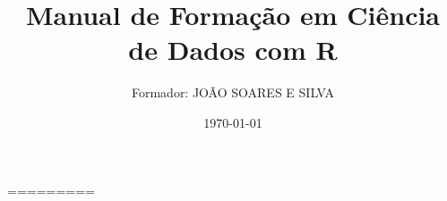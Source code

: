 \documentclass[12pt,a4paper]{article}
\title{\textbf{Manual de Formação em Ciência de Dados com R}}
\author{Formador: JOÃO SOARES E SILVA}
\date{\today}
\begin{document}
\maketitle
\tableofcontents
\newpage











=========







\end{document}
